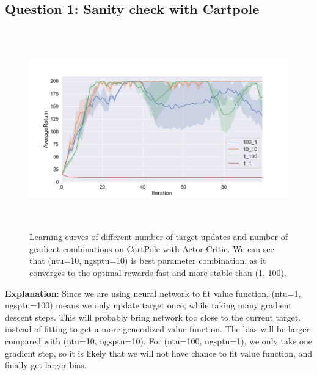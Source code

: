 \documentclass[12pt]{article}
\begin{document}
\subsection*{Question 1: Sanity check with Cartpole}
\begin{figure}[H]
  \centering
  \includegraphics[height=3.4in]{part2_q1.png}
  \caption{Learning curves of different number of target updates and number of gradient combinations on CartPole with Actor-Critic. We can see that (ntu=10, ngsptu=10) is best parameter combination, as it converges to the optimal rewards fast and more stable than (1, 100).}
\end{figure}
\textbf{Explanation}: Since we are using neural network to fit value function, (ntu=1, ngsptu=100) means we only update target once, while taking many gradient descent steps. This will probably bring network too close to the current target, instead of fitting to get a more generalized value function. The bias will be larger compared with (ntu=10, ngsptu=10). For (ntu=100, ngsptu=1), we only take one gradient step, so it is likely that we will not have chance to fit value function, and finally get larger bias.


\newpage
\end{document}
